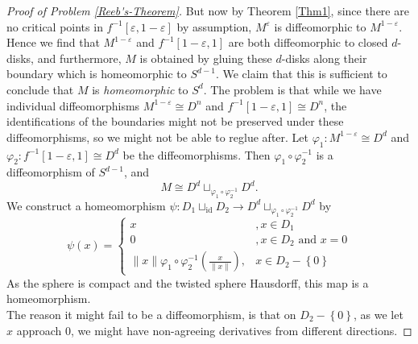 \documentclass[reqno]{amsart}
\theoremstyle{definition}
\theoremstyle{remark}
\newcommand{\id}{{\mathrm{id}}}
\begin{document}
\begin{proof}[Proof of Problem \ref{Reeb's-Theorem}]
         But now by Theorem \ref{Thm1}, since
         there are no critical points in
         $f^{-1}\left[ \varepsilon, 1- \varepsilon \right] $ 
         by assumption,
         $M^{\varepsilon}$ is diffeomorphic to
         $M^{1- \varepsilon}$.
         Hence we find that
         $M^{1-\varepsilon}$ and
         $f^{-1}\left[ 1-\varepsilon,1 \right] $ 
         are both diffeomorphic to closed $d$-disks, and
         furthermore,
         $M$ is obtained by gluing these  $d$-disks along their
         boundary which
         is homeomorphic to
         $S^{d-1}$. We claim that this is sufficient
         to conclude that $M$ is \textit{homeomorphic} to
         $S^{d}$.
         The problem is that while
         we have individual diffeomorphisms
         $M^{1-\varepsilon} \cong
         D^{n}$ and
         $f^{-1}\left[ 1-\varepsilon,1 \right] 
         \cong D^{n}$, the identifications of the boundaries
         might not be preserved under these diffeomorphisms,
         so we might not be able to reglue after.
         Let
         $\varphi_1 \colon M^{1- \varepsilon}
         \cong D^{d}$ and
         $\varphi_2 \colon
         f^{-1}\left[ 1-\varepsilon,1 \right] 
         \cong D^{d}$ be the diffeomorphisms.
         Then 
         $\varphi_1 \circ \varphi_2^{-1}$ is a diffeomorphism
         of $S^{d-1}$, and
         \[
         M \cong D^{d} \sqcup_{\varphi_1 \circ \varphi_2^{-1}}
         D^{d}.
         \] 
         We construct a homeomorphism
         $\psi \colon D_1 \sqcup_{\id} D_2 \to 
         D^{d} \sqcup_{\varphi_1 \circ \varphi_2^{-1}}
         D^{d}$ by
         \[
         \psi (x)
         =
         \begin{cases}
             x&, x \in D_1\\
             0&, x \in D_2 \text{ and } x = 0\\
             \|x\| \varphi_1 \circ
             \varphi_2^{-1} \left( \frac{x}{\|x\|} \right) ,&
             x \in D_2 - \left\{ 0 \right\} 
         \end{cases}
         \] 
         As the sphere is compact and
          the twisted sphere Hausdorff, this
          map is a homeomorphism.\\
          The reason it might fail to be a diffeomorphism, is
          that on $D_2 - \left\{ 0 \right\} $, as
          we  let $x$ approach $0$, we might have
          non-agreeing derivatives from different directions.

    \end{proof}
\end{document}
